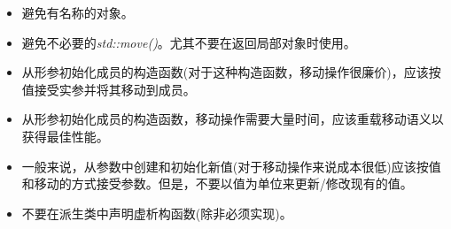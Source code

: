 \begin{itemize}
	\item 避免有名称的对象。
	\item 避免不必要的\textit{std::move()}。尤其不要在返回局部对象时使用。
	\item 从形参初始化成员的构造函数(对于这种构造函数，移动操作很廉价)，应该按值接受实参并将其移动到成员。
	\item 从形参初始化成员的构造函数，移动操作需要大量时间，应该重载移动语义以获得最佳性能。
	\item 一般来说，从参数中创建和初始化新值(对于移动操作来说成本很低)应该按值和移动的方式接受参数。但是，不要以值为单位来更新/修改现有的值。
	\item 不要在派生类中声明虚析构函数(除非必须实现)。
\end{itemize}


